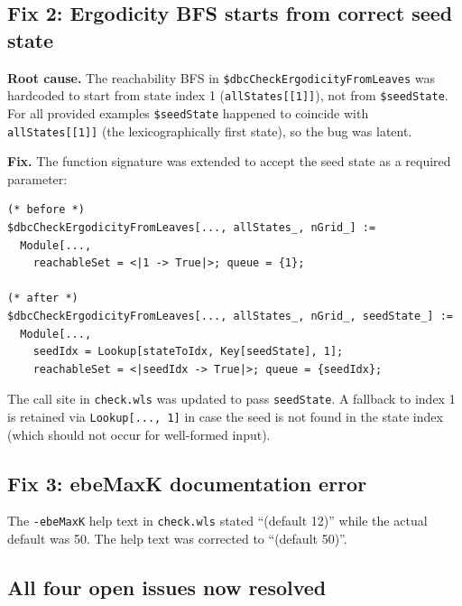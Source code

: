 \documentclass[12pt,a4paper]{article}
\theoremstyle{critical}
\theoremstyle{remark}
\begin{document}
\subsection{Fix 2: Ergodicity BFS starts from correct seed state}

\textbf{Root cause.}
The reachability BFS in \texttt{\$dbcCheckErgodicityFromLeaves} was hardcoded to start
from state index 1 (\texttt{allStates[[1]]}), not from \texttt{\$seedState}.
For all provided examples \texttt{\$seedState} happened to coincide with
\texttt{allStates[[1]]} (the lexicographically first state), so the bug was latent.

\textbf{Fix.}
The function signature was extended to accept the seed state as a required parameter:

\begin{lstlisting}
(* before *)
$dbcCheckErgodicityFromLeaves[..., allStates_, nGrid_] :=
  Module[...,
    reachableSet = <|1 -> True|>; queue = {1};

(* after *)
$dbcCheckErgodicityFromLeaves[..., allStates_, nGrid_, seedState_] :=
  Module[...,
    seedIdx = Lookup[stateToIdx, Key[seedState], 1];
    reachableSet = <|seedIdx -> True|>; queue = {seedIdx};
\end{lstlisting}

The call site in \texttt{check.wls} was updated to pass \texttt{seedState}. A fallback
to index 1 is retained via \texttt{Lookup[..., 1]} in case the seed is not found in the
state index (which should not occur for well-formed input).

\subsection{Fix 3: ebeMaxK documentation error}

The \texttt{-ebeMaxK} help text in \texttt{check.wls} stated ``(default 12)'' while the
actual default was 50. The help text was corrected to ``(default 50)''.

\subsection{All four open issues now resolved}
\end{document}
